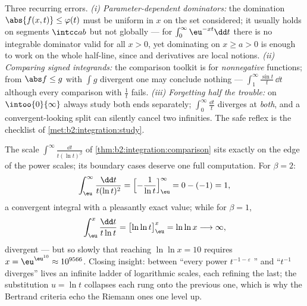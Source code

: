 \begin{remark}
Three recurring errors. \emph{(i) Parameter-dependent
dominators:} the domination $\abs{f(x,t)} \leq \varphi(t)$ must
be uniform in $x$ on the set considered; it usually holds on
segments $\intcc ab$ but not globally --- for
$\int_0^\infty\eu^{-xt}\dd t$ there is no integrable dominator
valid for all $x > 0$, yet dominating on $x \geq a > 0$ is
enough to work on the whole  half-line, since 
and derivatives are local notions. \emph{(ii) Comparing signed
integrands:} the comparison toolkit is for \emph{nonnegative}
functions; from $\abs f \leq g$ with $\int g$ divergent one may
conclude nothing --- $\int_1^\infty\frac{\sin t}t\,\dd t$
 although every comparison with $\frac1t$ fails.
\emph{(iii) Forgetting half the trouble:} on
$\intoo{0}{\infty}$ always study both ends separately;
$\int_0^\infty\frac{\dd t}{t}$ diverges at \emph{both}, and a
convergent-looking split can silently cancel two infinities.
The safe reflex is the checklist of
\cref{met:b2:integration:study}.
\end{remark}

\begin{example}\label{ex:b2:integration:bertrandboundary}
The scale $\int^\infty\frac{\dd t}{t(\ln t)^\beta}$ of
\cref{thm:b2:integration:comparison} sits exactly on the edge
of the power scales; its boundary cases deserve one full
computation. For $\beta = 2$:
\[
\int_\eu^{\infty}\frac{\dd t}{t(\ln t)^2}
= \Bigl[-\frac{1}{\ln t}\Bigr]_\eu^{\infty}
= 0 - (-1) = 1 ,
\]
a convergent integral with a pleasantly exact value; while for
$\beta = 1$,
\[
\int_\eu^{x}\frac{\dd t}{t\ln t}
= \bigl[\ln\ln t\bigr]_\eu^{x} = \ln\ln x
\longrightarrow \infty ,
\]
divergent --- but so slowly that reaching $\ln\ln x = 10$
requires $x = \eu^{\eu^{10}} \approx 10^{9566}$. Closing
insight: between ``every power $t^{-1-\varepsilon}$
'' and ``$t^{-1}$ diverges'' lives an infinite ladder
of logarithmic scales, each refining the last; the substitution
$u = \ln t$ collapses each rung onto the previous one, which
is why the Bertrand criteria echo the Riemann ones one level
up.
\end{example}

